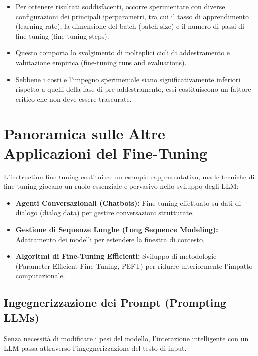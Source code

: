 \begin{itemize}
    \item Per ottenere risultati soddisfacenti, occorre sperimentare con diverse configurazioni dei principali iperparametri, tra cui il tasso di apprendimento (learning rate), la dimensione del batch (batch size) e il numero di passi di fine-tuning (fine-tuning steps).
    \item Questo comporta lo svolgimento di molteplici cicli di addestramento e valutazione empirica (fine-tuning runs and evaluations).
    \item Sebbene i costi e l'impegno sperimentale siano significativamente inferiori rispetto a quelli della fase di pre-addestramento, essi costituiscono un fattore critico che non deve essere trascurato.
\end{itemize}

\section*{Panoramica sulle Altre Applicazioni del Fine-Tuning}
L'instruction fine-tuning costituisce un esempio rappresentativo, ma le tecniche di fine-tuning giocano un ruolo essenziale e pervasivo nello sviluppo degli LLM:

\begin{itemize}
    \item \textbf{Agenti Conversazionali (Chatbots):} Fine-tuning effettuato su dati di dialogo (dialog data) per gestire conversazioni strutturate.
    \item \textbf{Gestione di Sequenze Lunghe (Long Sequence Modeling):} Adattamento dei modelli per estendere la finestra di contesto.
    \item \textbf{Algoritmi di Fine-Tuning Efficienti:} Sviluppo di metodologie (Parameter-Efficient Fine-Tuning, PEFT) per ridurre ulteriormente l'impatto computazionale.
\end{itemize}






















\subsection{Ingegnerizzazione dei Prompt (Prompting LLMs)}
Senza necessità di modificare i pesi del modello, l'interazione intelligente con un LLM passa attraverso l'ingegnerizzazione del testo di input.

